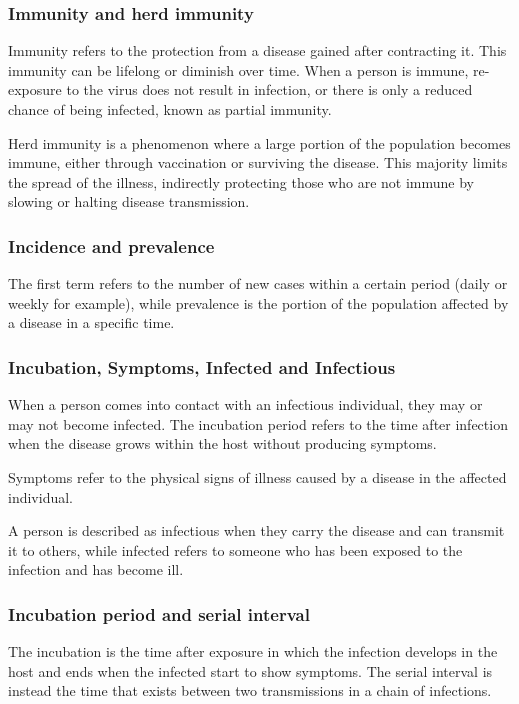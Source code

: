 \subsubsection{Immunity and herd immunity}
Immunity refers to the protection from a disease gained after contracting it. This immunity can be lifelong or diminish over time. When a person is immune, re-exposure to the virus does not result in infection, or there is only a reduced chance of being infected, known as partial immunity.

Herd immunity is a phenomenon where a large portion of the population becomes immune, either through vaccination or surviving the disease. This majority limits the spread of the illness, indirectly protecting those who are not immune by slowing or halting disease transmission.

\subsubsection{Incidence and prevalence} The first term refers to the number of new cases within a certain period (daily or weekly for example), while prevalence is the portion of the population affected by a disease in a specific time.

\subsubsection{Incubation, Symptoms, Infected and Infectious}  When a person comes into contact with an infectious individual, they may or may not become infected. The incubation period refers to the time after infection when the disease grows within the host without producing symptoms.

Symptoms refer to the physical signs of illness caused by a disease in the affected individual.

A person is described as infectious when they carry the disease and can transmit it to others, while infected refers to someone who has been exposed to the infection and has become ill.

\subsubsection{Incubation period and serial interval} The incubation is the time after exposure in which the infection develops in the host and ends when the infected start to show symptoms. The serial interval is instead the time that exists between two transmissions in a chain of infections. 


